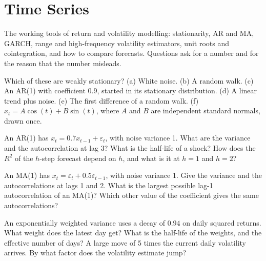 \chapter{Time Series}\label{ch:iv1:time-series}

\begin{ivtrains}
The working tools of return and volatility modelling: stationarity, AR and MA, GARCH, range and high-frequency volatility estimators, unit roots and cointegration, and how to compare forecasts. Questions ask for a number and for the reason that the number misleads.
\end{ivtrains}

\begin{question}\label{iq:iv1:time-series:1}
Which of these are weakly stationary? (a) White noise. (b) A random walk. (c) An AR(1) with coefficient $0.9$, started in its stationary distribution. (d) A linear trend plus noise. (e) The first difference of a random walk. (f) $x_t = A\cos(t) + B\sin(t)$, where $A$ and $B$ are independent standard normals, drawn once.
\end{question}

\begin{question}\label{iq:iv1:time-series:2}
An AR(1) has $x_t = 0.7x_{t-1} + \varepsilon_t$, with noise variance 1. What are the variance and the autocorrelation at lag 3? What is the half-life of a shock? How does the $R^2$ of the $h$-step forecast depend on $h$, and what is it at $h = 1$ and $h = 2$?
\end{question}

\begin{question}\label{iq:iv1:time-series:3}
An MA(1) has $x_t = \varepsilon_t + 0.5\varepsilon_{t-1}$, with noise variance 1. Give the variance and the autocorrelations at lags 1 and 2. What is the largest possible lag-1 autocorrelation of an MA(1)? Which other value of the coefficient gives the same autocorrelations?
\end{question}

\begin{question}\label{iq:iv1:time-series:4}
An exponentially weighted variance uses a decay of $0.94$ on daily squared returns. What weight does the latest day get? What is the half-life of the weights, and the effective number of days? A large move of 5 times the current daily volatility arrives. By what factor does the volatility estimate jump?
\end{question}

